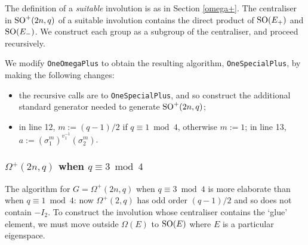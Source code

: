 \documentclass[12pt]{article}
\def\SO{{\rm SO}}
\def\w{\sigma} %
\begin{document}
The definition of a {\it suitable} involution is as in Section \ref{omega+}.
The centraliser in $\SO^+(2n,q)$ of a suitable involution 
contains the direct product of $\SO(E_+)$ and $\SO(E_-)$.
We construct each group as a subgroup of the
centraliser, and proceed recursively.

We modify {\tt OneOmegaPlus} to obtain the 
resulting algorithm, {\tt OneSpecialPlus}, 
by making the following changes:
\begin{itemize}
\item 
the recursive calls are to {\tt OneSpecialPlus},
and so construct the additional standard 
generator needed to generate $\SO^+(2n,q)$;
\item in line 12, $m := (q - 1) / 2$ if $q \equiv 1 \bmod 4$, otherwise
$m := 1$; in line 13, $a := (\w_1^m)^{v_1^{-1}} (\w_2^m)$.
\end{itemize}

\subsubsection{$\Omega^+(2n,q)$ when $q\equiv3\bmod4$}
The algorithm for $G=\Omega^+(2n,q)$ when 
$q\equiv3\bmod4$ is more elaborate than 
when $q\equiv1\bmod4$: 
now $\Omega^+(2,q)$ has odd order $(q - 1) / 2$ and so does
not contain $-I_2$. To construct the involution
whose centraliser contains the `glue' element,  we 
must move outside $\Omega(E)$ to $\SO(E)$ where 
$E$ is a particular eigenspace.
\end{document}
